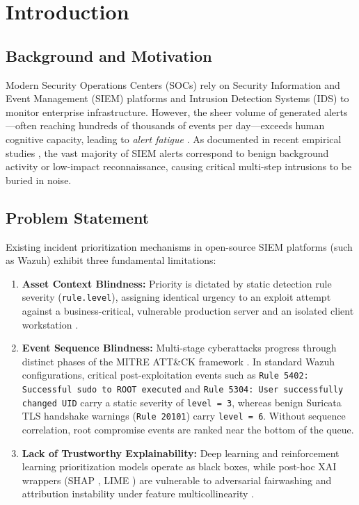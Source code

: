 \chapter{Introduction}
\label{chap:intro}

\section{Background and Motivation}
Modern Security Operations Centers (SOCs) rely on Security Information and Event Management (SIEM) platforms and Intrusion Detection Systems (IDS) to monitor enterprise infrastructure. However, the sheer volume of generated alerts---often reaching hundreds of thousands of events per day---exceeds human cognitive capacity, leading to \textit{alert fatigue} \cite{Ndichu2026}. As documented in recent empirical studies \cite{Gelman2023, Uetz2026}, the vast majority of SIEM alerts correspond to benign background activity or low-impact reconnaissance, causing critical multi-step intrusions to be buried in noise.

\section{Problem Statement}
Existing incident prioritization mechanisms in open-source SIEM platforms (such as Wazuh) exhibit three fundamental limitations:
\begin{enumerate}
    \item \textbf{Asset Context Blindness:} Priority is dictated by static detection rule severity (\texttt{rule.level}), assigning identical urgency to an exploit attempt against a business-critical, vulnerable production server and an isolated client workstation \cite{Podder2026, Koscinski2025}.
    \item \textbf{Event Sequence Blindness:} Multi-stage cyberattacks progress through distinct phases of the MITRE ATT\&CK framework \cite{MITRE2026}. In standard Wazuh configurations, critical post-exploitation events such as \texttt{Rule 5402: Successful sudo to ROOT executed} and \texttt{Rule 5304: User successfully changed UID} carry a static severity of \texttt{level = 3}, whereas benign Suricata TLS handshake warnings (\texttt{Rule 20101}) carry \texttt{level = 6}. Without sequence correlation, root compromise events are ranked near the bottom of the queue.
    \item \textbf{Lack of Trustworthy Explainability:} Deep learning and reinforcement learning prioritization models \cite{Tong2019, Chavali2022, Kalakoti2025} operate as black boxes, while post-hoc XAI wrappers (SHAP \cite{Lundberg2017}, LIME \cite{Ribeiro2016}) are vulnerable to adversarial fairwashing \cite{Mia2025} and attribution instability under feature multicollinearity \cite{Vourganas2026}.
\end{enumerate}

